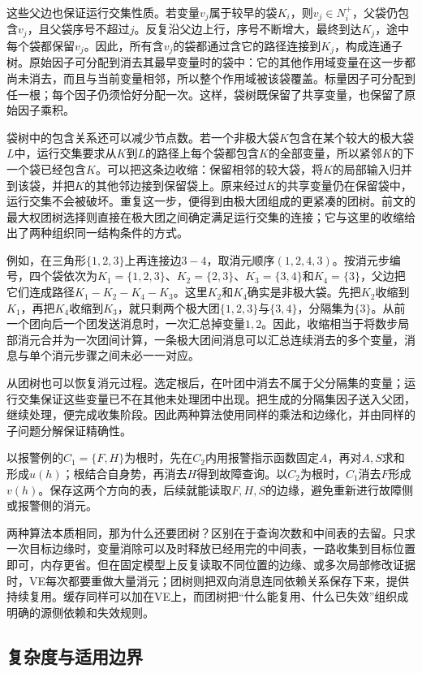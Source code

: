 这些父边也保证运行交集性质。若变量$v_j$属于较早的袋$K_i$，则$v_j\in N_i^+$，父袋仍包含$v_j$，且父袋序号不超过$j$。反复沿父边上行，序号不断增大，最终到达$K_j$，途中每个袋都保留$v_j$。因此，所有含$v_j$的袋都通过含它的路径连接到$K_j$，构成连通子树。原始因子可分配到消去其最早变量时的袋中：它的其他作用域变量在这一步都尚未消去，而且与当前变量相邻，所以整个作用域被该袋覆盖。标量因子可分配到任一根；每个因子仍须恰好分配一次。这样，袋树既保留了共享变量，也保留了原始因子乘积。

袋树中的包含关系还可以减少节点数。若一个非极大袋$K$包含在某个较大的极大袋$L$中，运行交集要求从$K$到$L$的路径上每个袋都包含$K$的全部变量，所以紧邻$K$的下一个袋已经包含$K$。可以把这条边收缩：保留相邻的较大袋，将$K$的局部输入归并到该袋，并把$K$的其他邻边接到保留袋上。原来经过$K$的共享变量仍在保留袋中，运行交集不会被破坏。重复这一步，便得到由极大团组成的更紧凑的团树。前文的最大权团树选择则直接在极大团之间确定满足运行交集的连接；它与这里的收缩给出了两种组织同一结构条件的方式。

例如，在三角形$\{1,2,3\}$上再连接边$3-4$，取消元顺序$(1,2,4,3)$。按消元步编号，四个袋依次为$K_1=\{1,2,3\}$、$K_2=\{2,3\}$、$K_3=\{3,4\}$和$K_4=\{3\}$，父边把它们连成路径$K_1-K_2-K_4-K_3$。这里$K_2$和$K_4$确实是非极大袋。先把$K_2$收缩到$K_1$，再把$K_4$收缩到$K_3$，就只剩两个极大团$\{1,2,3\}$与$\{3,4\}$，分隔集为$\{3\}$。从前一个团向后一个团发送消息时，一次汇总掉变量$1,2$。因此，收缩相当于将数步局部消元合并为一次团间计算，一条极大团间消息可以汇总连续消去的多个变量，消息与单个消元步骤之间未必一一对应。

从团树也可以恢复消元过程。选定根后，在叶团中消去不属于父分隔集的变量；运行交集保证这些变量已不在其他未处理团中出现。把生成的分隔集因子送入父团，继续处理，便完成收集阶段。因此两种算法使用同样的乘法和边缘化，并由同样的子问题分解保证精确性。

以报警例的$C_1=\{F,H\}$为根时，先在$C_2$内用报警指示函数固定$A$，再对$A,S$求和形成$u(h)$；根结合自身势，再消去$H$得到故障查询。以$C_2$为根时，$C_1$消去$F$形成$v(h)$。保存这两个方向的表，后续就能读取$F,H,S$的边缘，避免重新进行故障侧或报警侧的消元。

两种算法本质相同，那为什么还要团树？区别在于查询次数和中间表的去留。只求一次目标边缘时，变量消除可以及时释放已经用完的中间表，一路收集到目标位置即可，内存更省。但在固定模型上反复读取不同位置的边缘、或多次局部修改证据时，VE每次都要重做大量消元；团树则把双向消息连同依赖关系保存下来，提供持续复用。缓存同样可以加在VE上，而团树把“什么能复用、什么已失效”组织成明确的源侧依赖和失效规则。

\subsection{复杂度与适用边界}
\label{sec:pgm-junction-tree-complexity}

